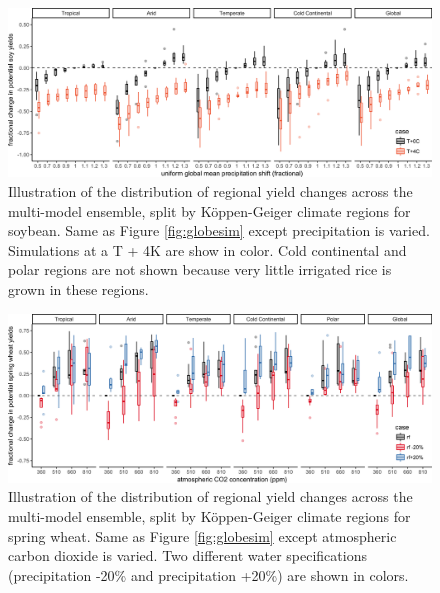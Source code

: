 \documentclass[gmd, manuscript]{copernicus} %
\begin{document}
\begin{figure}[ht]
\centering
   \includegraphics[width=15cm]{figures/soy_sim_CG_W.png}
   \caption{Illustration of the distribution of regional yield changes across the multi-model ensemble, split by K\"{o}ppen-Geiger climate regions for soybean. Same as Figure \ref{fig:globesim} except precipitation is varied. Simulations at a T + 4K are show in color. Cold continental and polar regions are not shown because very little irrigated rice is grown in these regions.}
   \label{fig:globesim_W}
\end{figure}

\begin{figure}[ht]
\centering
   \includegraphics[width=15cm]{figures/swh_sim_CG_C.png}
   \caption{Illustration of the distribution of regional yield changes across the multi-model ensemble, split by K\"{o}ppen-Geiger climate regions for spring wheat. Same as Figure \ref{fig:globesim} except atmospheric carbon dioxide is varied. Two different water specifications (precipitation -20\% and precipitation +20\%) are shown in colors.}
   \label{fig:globesim_C}
\end{figure}
\end{document}
